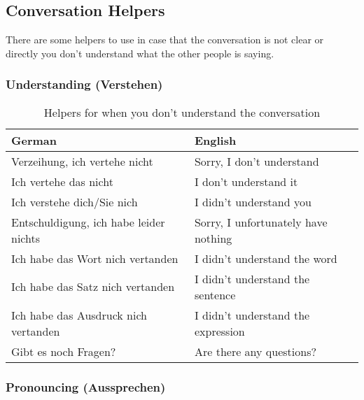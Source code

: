 \subsection{Conversation Helpers}\label{subsec:helpers}

There are some helpers to use in case that the conversation is not clear or directly you don't understand what the other people is saying.

\subsubsection{Understanding (Verstehen)}

\begin{table}[H]
    \centering
    \begin{tabular}{l|l}
        \textbf{German} & \textbf{English} \\
        \hline
        Verzeihung, ich vertehe nicht & Sorry, I don't understand\\
        Ich vertehe das nicht & I don't understand it\\
        Ich verstehe dich/Sie nich & I didn't understand you\\
        Entschuldigung, ich habe leider nichts & Sorry, I unfortunately have nothing\\
        Ich habe das Wort nich vertanden & I didn't understand the word\\
        Ich habe das Satz nich vertanden & I didn't understand the sentence\\
        Ich habe das Ausdruck nich vertanden & I didn't understand the expression\\
        Gibt es noch Fragen? & Are there any questions?
    \end{tabular}
    \caption{Helpers for when you don't understand the conversation}
    \label{tab:helpersunderstanding}
\end{table}


\subsubsection{Pronouncing (Aussprechen)}

